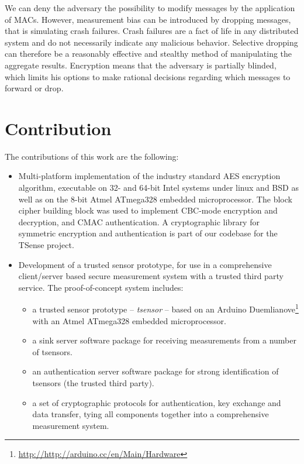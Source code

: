 We can deny the adversary the possibility to modify messages by the application of MACs. However, measurement bias can be introduced by dropping messages, that is simulating crash failures. Crash failures are a fact of life in any distributed system and do not necessarily indicate any malicious behavior. Selective dropping can therefore be a reasonably effective and stealthy method of manipulating the aggregate results. Encryption means that the adversary is partially blinded, which limits his options to make rational decisions regarding which messages to forward or drop. 

\section{Contribution}

The contributions of this work are the following:
\begin{itemize}
\item Multi-platform implementation of the industry standard AES encryption algorithm, executable on 32- and 64-bit Intel systems under linux and BSD as well as on the 8-bit Atmel ATmega328 embedded microprocessor. The block cipher building block was used to implement CBC-mode encryption and decryption, and CMAC authentication. A cryptographic library for symmetric encryption and authentication is part of our codebase for the TSense project.
\item Development of a trusted sensor prototype, for use in a comprehensive client/server based secure measurement system with a trusted third party service. The proof-of-concept system includes:
\begin{itemize}
\item a trusted sensor prototype -- \textit{tsensor} -- based on an Arduino Duemlianove\footnote{\url{http://http://arduino.cc/en/Main/Hardware}} with an Atmel ATmega328 embedded microprocessor.
\item a sink server software package for receiving measurements from a number of tsensors.
\item an authentication server software package for strong identification of tsensors (the trusted third party).
\item a set of cryptographic protocols for authentication, key exchange and data transfer, tying all components together into a comprehensive measurement system.
\end{itemize}
\end{itemize}

